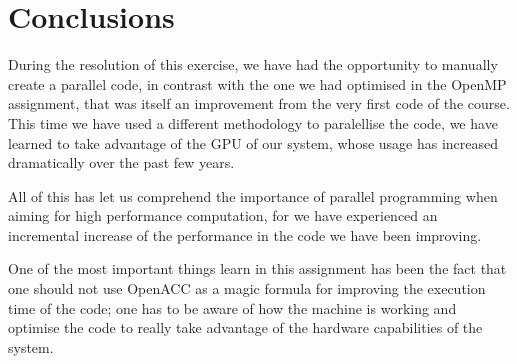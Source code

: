 \section{Conclusions}

During the resolution of this exercise, we have had the opportunity to manually create a parallel code, in contrast with the one we had optimised in the OpenMP assignment, that was itself an improvement from the very first code of the course. This time we have used a different methodology to paralellise the code, we have learned to take advantage of the GPU of our system, whose usage has increased dramatically over the past few years.

All of this has let us comprehend the importance of parallel programming when aiming for high performance computation, for we have experienced an incremental increase of the performance in the code we have been improving.

One of the most important things learn in this assignment has been the fact that one should not use OpenACC as a magic formula for improving the execution time of the code; one has to be aware of how the machine is working and optimise the code to really take advantage of the hardware capabilities of the system.
